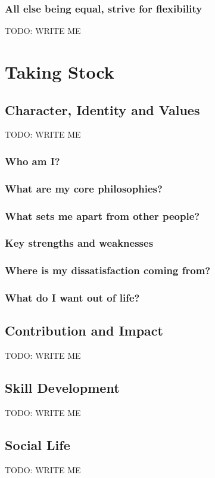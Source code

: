 \documentclass[]{book}
\newcommand{\TOWRITE}{TODO: WRITE ME}
\begin{document}
\section{All else being equal, strive for flexibility}
\TOWRITE


\part{Taking Stock}

\chapter{Character, Identity and Values}
\TOWRITE

\section{Who am I?}
\section{What are my core philosophies?}
\section{What sets me apart from other people?}
\section{Key strengths and weaknesses}
\section{Where is my dissatisfaction coming from?}
\section{What do I want out of life?}





\chapter{Contribution and Impact}
\TOWRITE

\chapter{Skill Development}
\TOWRITE

\chapter{Social Life}
\TOWRITE
\end{document}
